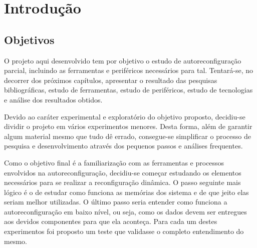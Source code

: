 \documentclass[11pt,a4paper,oneside]{book}
\begin{document}
	\frontmatter
	\tableofcontents
	\mainmatter
	
	\newcommand\qt[1]{\lq\lq{}#1\rq\rq{}}
	\newcommand\qti[1]{\lq\lq{}\textit{#1}\rq\rq{}}
\fi


\chapter{Introdu\c{c}\~{a}o}
\label{cap:introducao}

\vspace{0.8cm}

\section{Objetivos}
O projeto aqui desenvolvido tem por objetivo o estudo de autoreconfiguração parcial, incluindo as ferramentas e periféricos necessários para tal.
Tentará-se, no decorrer dos próximos capítulos, apresentar o resultado das pesquisas bibliográficas, estudo de ferramentas, estudo de periféricos, estudo de tecnologias e análise dos resultados obtidos.

Devido ao caráter experimental e exploratório do objetivo proposto, decidiu-se dividir o projeto em vários experimentos menores.
Desta forma, além de garantir algum material mesmo que tudo dê errado, consegue-se simplificar o processo de pesquisa e desenvolvimento através dos pequenos passos e análises frequentes.

Como o objetivo final é a familiarização com as ferramentas e processos envolvidos na autoreconfiguração, decidiu-se começar estudando os elementos necessários para se realizar a reconfiguração dinâmica.
O passo seguinte mais lógico é o de estudar como funciona as memórias dos sistema e de que jeito elas seriam melhor utilizadas.
O último passo seria entender como funciona a autoreconfiguração em baixo nível, ou seja, como os dados devem ser entregues aos devidos componentes para que ela aconteça.
Para cada um destes experimentos foi proposto um teste que validasse o completo entendimento do mesmo.
\end{document}
